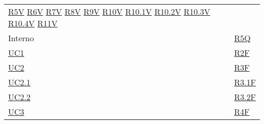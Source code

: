 \begin{center}
\begin{longtable}[!h]{m{50px} m{50px}}
        \newline \hyperref[tab:RequisitiVincolo]{R5V}
        \newline \hyperref[tab:RequisitiVincolo]{R6V}
        \newline \hyperref[tab:RequisitiVincolo]{R7V}
        \newline \hyperref[tab:RequisitiVincolo]{R8V}
        \newline \hyperref[tab:RequisitiVincolo]{R9V}
        \newline \hyperref[tab:RequisitiVincolo]{R10V}
        \newline \hyperref[tab:RequisitiVincolo]{R10.1V}
        \newline \hyperref[tab:RequisitiVincolo]{R10.2V}
        \newline \hyperref[tab:RequisitiVincolo]{R10.3V}
        \newline \hyperref[tab:RequisitiVincolo]{R10.4V}
        \newline \hyperref[tab:RequisitiVincolo]{R11V}                                  \\

        Interno                           &                                             %
        \hyperref[tab:RequisitiQualita]{R5Q}                                            \\

        \hyperref[sec:UC1]{UC1}           & \hyperref[tab:RequisitiFunzionali]{R2F}     \\

        \hyperref[sec:UC2]{UC2}           & \hyperref[tab:RequisitiFunzionali]{R3F}     \\
        \hyperref[sec:UC2.1]{UC2.1}       & \hyperref[tab:RequisitiFunzionali]{R3.1F}   \\
        \hyperref[sec:UC2.2]{UC2.2}       & \hyperref[tab:RequisitiFunzionali]{R3.2F}   \\

        \hyperref[sec:UC3]{UC3}           & \hyperref[tab:RequisitiFunzionali]{R4F}     \\


\end{longtable}
\end{center}
